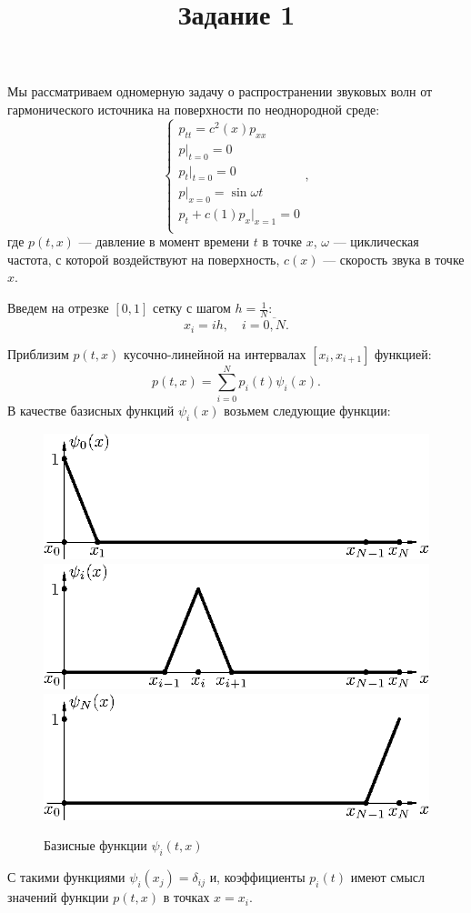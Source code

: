 \documentclass[12pt]{article}
\title{Задание 1}
\date{}
\begin{document}
\maketitle

Мы рассматриваем одномерную задачу о распространении звуковых волн от
гармонического источника на поверхности по неоднородной среде:
\[
\begin{cases}
p_{tt} = c^2(x) p_{xx}\\
p\big|_{t = 0} = 0\\
p_t\big|_{t = 0} = 0\\
p\big|_{x = 0} = \sin \omega t\\
p_t + c(1) p_x \big|_{x = 1} = 0\\
\end{cases},
\]
где $p(t, x)$ --- давление в момент времени $t$ в точке $x$, $\omega$ ---
циклическая частота, с которой воздействуют на поверхность, $c(x)$ --- скорость
звука в точке $x$.

Введем на отрезке $[0, 1]$ сетку с шагом $h = \frac{1}{N}$: 
\[x_i = ih, \quad i =
\overline{0, N}.
\]

Приблизим $p(t, x)$ кусочно-линейной на интервалах $[x_i, x_{i+1}]$ функцией:
\[
p(t, x) = \sum_{i = 0}^N p_i(t) \psi_i(x).
\]
В качестве базисных функций $\psi_i(x)$ возьмем следующие функции:
\begin{figure}[!ht]
\centering
\includegraphics[width=.5\textwidth]{box-0.eps}\\
\includegraphics[width=.5\textwidth]{box-1.eps}\\
\includegraphics[width=.5\textwidth]{box-2.eps}%
\caption{Базисные функции $\psi_i(t,x)$}
\end{figure}

С такими функциями $\psi_i(x_j) = \delta_{ij}$ и, коэффициенты $p_i(t)$ имеют
смысл значений функции $p(t, x)$ в точках $x = x_i$.
\end{document}
